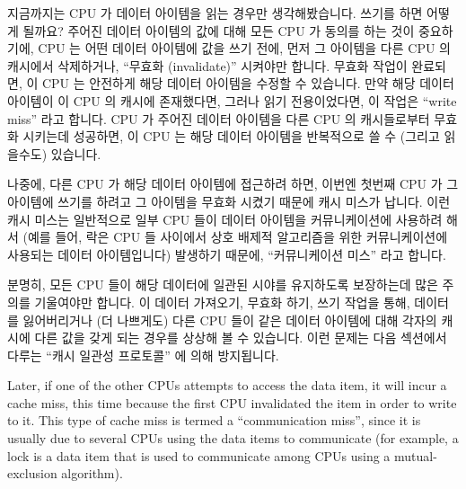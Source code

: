 지금까지는 CPU 가 데이터 아이템을 읽는 경우만 생각해봤습니다.
쓰기를 하면 어떻게 될까요?
주어진 데이터 아이템의 값에 대해 모든 CPU 가 동의를 하는 것이 중요하기에, CPU
는 어떤 데이터 아이템에 값을 쓰기 전에, 먼저 그 아이템을 다른 CPU 의 캐시에서
삭제하거나, ``무효화 (invalidate)'' 시켜야만 합니다.
무효화 작업이 완료되면, 이 CPU 는 안전하게 해당 데이터 아이템을 수정할 수
있습니다.
만약 해당 데이터 아이템이 이 CPU 의 캐시에 존재했다면, 그러나 읽기
전용이었다면, 이 작업은 ``write miss'' 라고 합니다.
CPU 가 주어진 데이터 아이템을 다른 CPU 의 캐시들로부터 무효화 시키는데
성공하면, 이 CPU 는 해당 데이터 아이템을 반복적으로 쓸 수 (그리고 읽을수도)
있습니다.

나중에, 다른 CPU 가 해당 데이터 아이템에 접근하려 하면, 이번엔 첫번째 CPU 가 그
아이템에 쓰기를 하려고 그 아이템을 무효화 시켰기 때문에 캐시 미스가 납니다.
이런 캐시 미스는 일반적으로 일부 CPU 들이 데이터 아이템을 커뮤니케이션에
사용하려 해서 (예를 들어, 락은 CPU 들 사이에서 상호 배제적 알고리즘을 위한
커뮤니케이션에 사용되는 데이터 아이템입니다) 발생하기 때문에, ``커뮤니케이션
미스'' 라고 합니다.

분명히, 모든 CPU 들이 해당 데이터에 일관된 시야를 유지하도록 보장하는데 많은
주의를 기울여야만 합니다.
이 데이터 가져오기, 무효화 하기, 쓰기 작업을 통해, 데이터를 잃어버리거나 (더
나쁘게도) 다른 CPU 들이 같은 데이터 아이템에 대해 각자의 캐시에 다른 값을 갖게
되는 경우를 상상해 볼 수 있습니다.
이런 문제는 다음 섹션에서 다루는 ``캐시 일관성 프로토콜'' 에 의해 방지됩니다.
\iffalse

Later, if one of the other CPUs attempts to access the data item, it
will incur a cache miss, this time because the first CPU invalidated
the item in order to write to it.
This type of cache miss is termed a ``communication miss'', since it
is usually due to several CPUs using the data items to communicate
(for example, a lock is a data item that is used to communicate among
CPUs using a mutual-exclusion algorithm).

